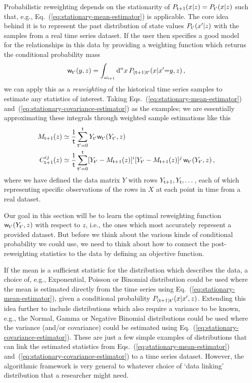 Probabilistic reweighting depends on the stationarity of $P_{{\sf t}+1}(x\vert z)=P_{{\sf t}'}(x\vert z)$ such that, e.g., Eq.~(\ref{eq:stationary-mean-estimator}) is applicable. The core idea behind it is to represent the past distribution of state values $P_{{\sf t}'}(x'\vert z)$ with the samples from a real time series dataset. If the user then specifies a good model for the relationships in this data by providing a weighting function which returns the conditional probability mass
\begin{align}
{\sf w}_{{\sf t}'}(y,z) = \int_{\omega_{{\sf t}+1}} {\rm d}^nx \, P_{({\sf t}+1){\sf t}'}(x\vert x'{=}y,z) \,,  
\end{align}
we can apply this as a \emph{reweighting} of the historical time series samples to estimate any statistics of interest. Taking Eqs.~(\ref{eq:stationary-mean-estimator}) and~(\ref{eq:stationary-covariance-estimator}) as the examples; we are essentially approximating these integrals through weighted sample estimations like this
\begin{align}
M_{{\sf t}+1}(z) &\simeq \frac{1}{{\sf t}}\sum^{{\sf t}}_{{\sf t}'=0}Y_{{\sf t}'} {\sf w}_{{\sf t}'}(Y_{{\sf t}'},z) \label{eq:mean-reweighting} \\
C^{ij}_{{\sf t}+1}(z) &\simeq \frac{1}{{\sf t}}\sum^{{\sf t}}_{{\sf t}'=0}[Y_{{\sf t}'}-M_{{\sf t}+1}(z)]^i[Y_{{\sf t}'}-M_{{\sf t}+1}(z)]^j \, {\sf w}_{{\sf t}'}(Y_{{\sf t}'},z) \label{eq:covariance-reweighting} \,,
\end{align}
where we have defined the data matrix $Y$ with rows $Y_{{\sf t}+1}, Y_{{\sf t}}, \dots$, each of which representing specific observations of the rows in $X$ at each point in time from a real dataset.

Our goal in this section will be to learn the optimal reweighting function ${\sf w}_{{\sf t}'}(Y_{{\sf t}'},z)$ with respect to $z$, i.e., the ones which most accurately represent a provided dataset. But before we think about the various kinds of conditional probability we could use, we need to think about how to connect the post-reweighting statistics to the data by defining an objective function. 

If the mean is a sufficient statistic for the distribution which describes the data, a choice of, e.g., Exponential, Poisson or Binomial distribution could be used where the mean is estimated directly from the time series using Eq.~(\ref{eq:stationary-mean-estimator}), given a conditional probability $P_{({\sf t}+1){\sf t}'}(x\vert x',z)$. Extending this idea further to include distributions which also require a variance to be known, e.g., the Normal, Gamma or Negative Binomial distributions could be used where the variance (and/or covariance) could be estimated using Eq.~(\ref{eq:stationary-covariance-estimator}). These are just a few simple examples of distributions that can link the estimated statistics from Eqs.~(\ref{eq:stationary-mean-estimator}) and~(\ref{eq:stationary-covariance-estimator}) to a time series dataset. However, the algorithmic framework is very general to whatever choice of `data linking' distribution that a researcher might need.

